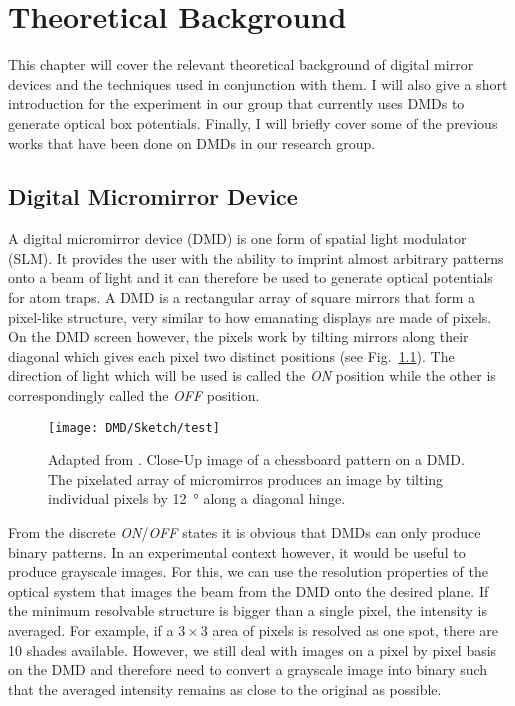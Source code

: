 

\chapter{Theoretical Background}
\label{cha:dmd_theory}
This chapter will cover the relevant theoretical background of digital mirror devices and the techniques used in conjunction with them. I will also give a short introduction for the experiment in our group that currently uses DMDs to generate optical box potentials. Finally, I will briefly cover some of the previous works that have been done on DMDs in our research group.

\section{Digital Micromirror Device}
\label{sec:digital_micromirror_device}
A digital micromirror device (DMD) is one form of spatial light modulator (SLM). It provides the user with the ability to imprint almost arbitrary patterns onto a beam of light and it can therefore be used to generate optical potentials for atom traps. A DMD is a rectangular array of square mirrors that form a pixel-like structure, very similar to how emanating displays are made of pixels. On the DMD screen however, the pixels work by tilting mirrors along their diagonal which gives each pixel two distinct positions (see Fig.~\ref{fig:dmd_example}). The direction of light which will be used is called the \emph{ON} position while the other is correspondingly called the \emph{OFF} position. \cite{texasinstruments:2018}
%
\begin{figure}[htbp]
    \centering
    \texttt{[image: DMD/Sketch/test]}
    \caption[Close-up image of a chessboard pattern on a DMD]{Adapted from \cite{krstajic}. Close-Up image of a chessboard pattern on a DMD. The pixelated array of micromirros produces an image by tilting individual pixels by \SI{12}{\degree} along a diagonal hinge.}
    \label{fig:dmd_example}
\end{figure}

\noindent
From the discrete \emph{ON}/\emph{OFF} states it is obvious that DMDs can only produce binary patterns. In an experimental context however, it would be useful to produce grayscale images. For this, we can use the resolution properties of the optical system that images the beam from the DMD onto the desired plane. If the minimum resolvable structure is bigger than a single pixel, the intensity is averaged. For example, if a $3\times 3$ area of pixels is resolved as one spot, there are 10 shades available. However, we still deal with images on a pixel by pixel basis on the DMD and therefore need to convert a grayscale image into binary such that the averaged intensity remains as close to the original as possible.

